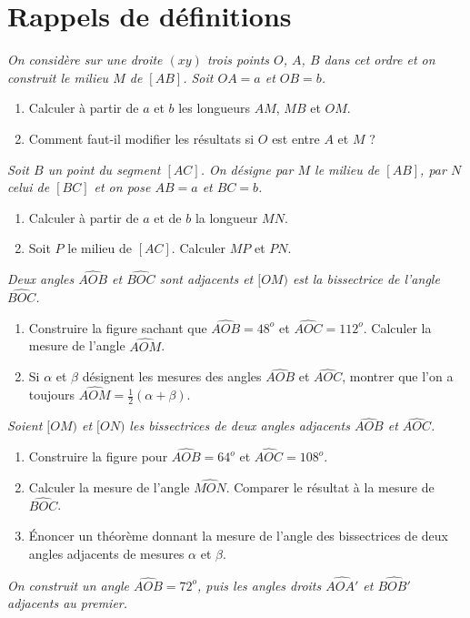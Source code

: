 \chapter{Rappels de définitions}

\begin{itemize}
\it On considère sur une droite $(xy)$ trois points $O$, $A$, $B$ dans cet ordre et on construit le milieu $M$ de $[AB]$. Soit $OA=a$ et $OB=b$. \begin{enumerate}
\item Calculer à partir de $a$ et $b$ les longueurs 
$AM$, $MB$ et $OM$. 
\item Comment faut-il modifier les résultats si $O$ est entre $A$ et $M$ ? 
\end{enumerate}
\it Soit $B$ un point du segment $[AC]$. On désigne par $M$ le milieu de $[AB]$, par $N$ celui de $[BC]$ et on pose $AB = a$ et $BC = b$. \begin{enumerate}
\item Calculer à partir de $a$ et de $b$ la longueur $MN$. 
\item Soit $P$ le milieu de $[AC]$. Calculer $MP$ et $PN$. 
\end{enumerate}
\it Deux angles $\widehat{AOB}$ et $\widehat{BOC}$ sont adjacents et $[OM)$ est la bissectrice de l'angle 
$\widehat{BOC}$. \begin{enumerate}
\item Construire la figure sachant que $\widehat{AOB}=48^o$ et $\widehat{AOC}= 112^o$. Calculer la mesure de
l'angle $\widehat{AOM}$. 
\item Si $\alpha$ et $\beta$ désignent les mesures des angles $\widehat{AOB}$ et $\widehat{AOC}$, montrer que l'on a toujours $\widehat{AOM}= \frac12(\alpha+\beta)$.  
\end{enumerate}
\it Soient $[OM)$ et $[ON)$ les bissectrices de deux angles adjacents $\widehat{AOB}$ et $\widehat{AOC}$. 
\begin{enumerate}
\item Construire la figure pour $\widehat{AOB}= 64^o$ et $\widehat{AOC}= 108^o$.
\item Calculer la mesure de l'angle $\widehat{MON}$. Comparer le résultat à la mesure de $\widehat{BOC}$. 
\item Énoncer un théorème donnant la mesure de l'angle des bissectrices de deux angles adjacents de mesures $\alpha$ et $\beta$.
\end{enumerate}
\it On construit un angle $\widehat{AOB}= 72^o$, puis les angles droits $\widehat{AOA'}$ et $\widehat{BOB'}$ adjacents au premier. 

\end{itemize}
